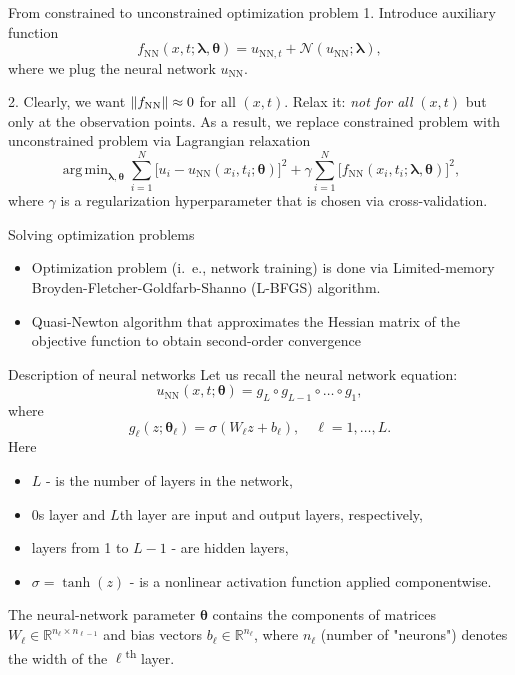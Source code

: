 \documentclass{beamer}
\def\\{}%
\renewcommand{\vec}[1]{\boldsymbol{#1}}
\newcommand{\VTheta}{\ensuremath{\vec{\theta}}}
\newcommand{\VLambda}{\ensuremath{\vec{\lambda}}}
\DeclareMathOperator*{\argmin}{arg\,min}
\newcommand{\R}{\mathbb R}
\newcommand{\UNN}[1][\text{NN}]{u_{#1}}
\newcommand{\FNN}[1][\text{NN}]{f_{#1}}
\newcommand{\NonlinOp}{\mathcal N\!}
\DeclarePairedDelimiter\norm{\lVert}{\rVert}
\begin{document}
\begin{frame}{From constrained to unconstrained optimization problem}
1. Introduce auxiliary function
\begin{equation*}
    \FNN(x, t; \VLambda, \VTheta) =
        u_{\text{NN}, t} + \NonlinOp(u_{\text{NN}}; \VLambda),
\end{equation*}
where we plug the neural network $\UNN$.


\vspace{0.5cm}
2. Clearly, we want $\norm{\FNN} \approx 0$ for all $(x, t)$.\\
Relax it: \emph{not for all} $(x, t)$ but only at the observation points.\\
As a result, we replace constrained problem with unconstrained problem via
Lagrangian relaxation
\begin{equation*}
    \argmin_{\VLambda, \VTheta}
    \sum_{i=1}^N \big[ u_i - \UNN(x_i, t_i; \VTheta)\big ]^2
    +\gamma \sum_{i=1}^N \big[ \FNN(x_i, t_i; \VLambda, \VTheta) \big]^2,
\end{equation*}
where $\gamma$ is a regularization hyperparameter that is chosen via cross-validation.
    
\end{frame}

\begin{frame}{Solving optimization problems}
\begin{itemize}
    \item Optimization problem (i.\ e., network training) is done via Limited-memory
Broyden-Fletcher-Goldfarb-Shanno (L-BFGS) algorithm.

    \item Quasi-Newton algorithm that approximates the Hessian matrix of the objective
function to obtain second-order convergence
\end{itemize}
\end{frame}

\begin{frame}{Description of neural networks}
\small    
Let us recall the neural network equation:
$$
\UNN(x, t; \vec{\theta}) = g_L \circ g_{L-1} \circ \dots \circ g_1,
$$
where
\[
    g_\ell(z; \VTheta_\ell) = \sigma (W_\ell z + b_\ell), \quad \ell = 1,\dots,L.
\]
Here 
\begin{itemize}
    \item $L$  - is the number of layers in the network,
    \item 0s layer and $L$th layer are input and output layers, respectively,
    \item layers from 1 to $L-1$ - are hidden layers,
    \item $\sigma = \tanh (z) $ - is a nonlinear activation function applied componentwise.
\end{itemize} 
 
The neural-network parameter $\VTheta$ contains the components of matrices
$W_\ell \in \R^{n_{\ell}\times n_{\ell-1}}$ and bias vectors
$b_\ell \in \R^{n_\ell}$, where $n_\ell$  (number of "neurons") denotes the width of the
$\ell$\textsuperscript{th} layer.
    
\end{frame}
\end{document}
